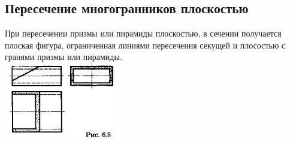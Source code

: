\documentclass[a4paper, 12pt]{article}
\begin{document}
\subsection{Пересечение многогранников плоскостью}

При пересечении призмы или пирамиды плоскостью, в сечении получается плоская фигура, ограниченная линиями пересечения секущей и плосостью с гранями призмы или пирамиды.\\
\includegraphics{img/641.png}\\
\end{document}
